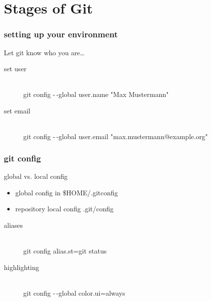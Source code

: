 \section{Stages of Git}


\begin{frame}
    \frametitle{setting up your environment}
    Let git know who you are\ldots
    \begin{description}
        \item[set user] \hfill \\
            git config -\,-global user.name "Max Mustermann"
        \item[set email] \hfill \\
            git config -\,-global user.email "max.mustermann@example.org"
    \end{description}
\end{frame}

\begin{frame}
    \frametitle{git config}
    global vs. local config
    \begin{itemize}
        \item global config in \$HOME/.gitconfig
        \item repository local config .git/config
    \end{itemize}
    \begin{description}
        \item[aliases] \hfill \\
            git config alias.st=git status
        \item[highlighting] \hfill \\
            git config -\,-global color.ui=always
    \end{description}
\end{frame}

